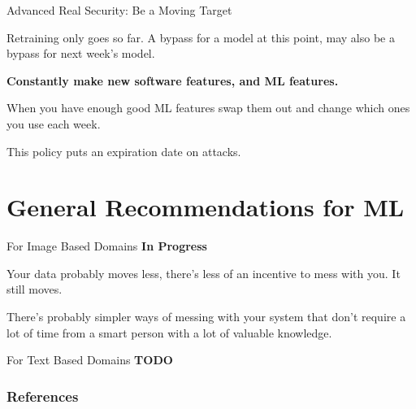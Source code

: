 \documentclass{beamer}
\begin{document}
\begin{frame}{Advanced Real Security: Be a Moving Target}
    \begin{center}
        Retraining only goes so far. A bypass for a model at this point, may also be a bypass for next week's model.
        \vspace{10pt}
        
        \textbf{Constantly make new software features, and ML features.}  
        \vspace{10pt}

        When you have enough good ML features swap them out and change which ones you use each week. 
        \vspace{10pt}
        
        This policy puts an expiration date on attacks. \cite{proofpoint_cve}
    \end{center}
\end{frame}

\section{General Recommendations for ML}

\begin{frame}{For Image Based Domains}
    \textbf{In Progress}
    \vspace{10pt}

    Your data probably moves less, there's less of an incentive to mess with you. It still moves.
    \vspace{10pt}

    There's probably simpler ways of messing with your system that don't require a lot of time from a smart person with a lot of valuable knowledge.
\end{frame}

\begin{frame}{For Text Based Domains}
    \textbf{TODO}
\end{frame}

\begin{frame}[t, allowframebreaks]
\frametitle{References}


\end{frame}
\end{document}
